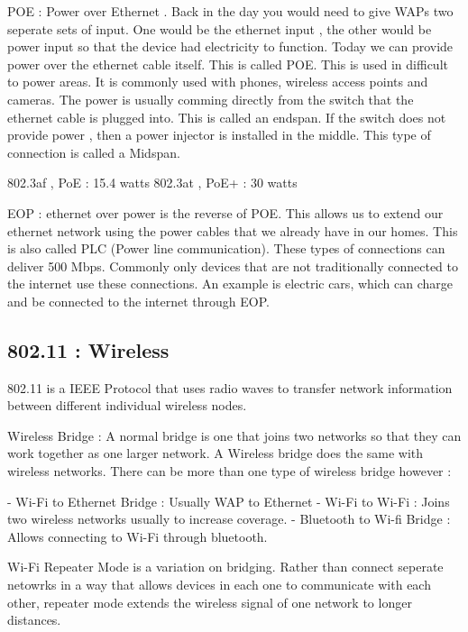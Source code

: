 POE : Power over Ethernet . Back in the day you would need to give WAPs two
seperate sets of input. One would be the ethernet input , the other would be
power input so that the device had electricity to function. Today we can provide
power over the ethernet cable itself. This is called POE. This is used in
difficult to power areas. It is commonly used with phones, wireless access
points and cameras. The power is usually comming directly from the switch that
the ethernet cable is plugged into. This is called an endspan. If the switch
does not provide power , then a power injector is installed in the middle. This
type of connection is called a Midspan.

802.3af , PoE : 15.4 watts
802.3at , PoE+ : 30 watts

EOP : ethernet over power is the reverse of POE. This allows us to extend our
ethernet network using the power cables that we already have in our homes. This
is also called PLC (Power line communication). These types of connections can
deliver 500 Mbps. Commonly only devices that are not traditionally connected to
the internet use these connections. An example is electric cars, which can
charge and be connected to the internet through EOP.

\subsectionend

\subsection{802.11 : Wireless}
\label{ssec:802_11_wireless}

802.11 is a IEEE Protocol that uses radio waves to transfer network information
between different individual wireless nodes.

Wireless Bridge : A normal bridge is one that joins two networks so that they
can work together as one larger network. A Wireless bridge does the same with
wireless networks. There can be more than one type of wireless bridge however :

- Wi-Fi to Ethernet Bridge : Usually WAP to Ethernet
- Wi-Fi to Wi-Fi : Joins two wireless networks usually to increase coverage.
- Bluetooth to Wi-fi Bridge : Allows connecting to Wi-Fi through bluetooth.

Wi-Fi Repeater Mode is a variation on bridging. Rather than connect seperate
netowrks in a way that allows devices in each one to communicate with each
other, repeater mode extends the wireless signal of one network to longer
distances.

